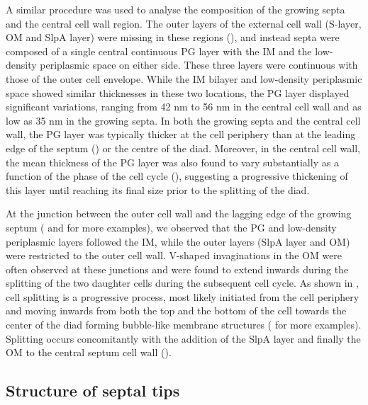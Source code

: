 A similar procedure was used to analyse the composition of the growing septa and the central cell wall region.
The outer layers of the external cell wall (S-layer, OM and SlpA layer) were missing in these regions (), and instead septa were composed of a single central continuous PG layer with the IM and the low-density periplasmic space on either side.
These three layers were continuous with those of the outer cell envelope.
While the IM bilayer and low-density periplasmic space showed similar thicknesses in these two locations, the PG layer displayed significant variations, ranging from 42 nm to 56 nm in the central cell wall and as low as 35 nm in the growing septa.
In both the growing septa and the central cell wall, the PG layer was typically thicker at the cell periphery than at the leading edge of the septum () or the centre of the diad.
Moreover, in the central cell wall, the mean thickness of the PG layer was also found to vary substantially as a function of the phase of the cell cycle (), suggesting a progressive thickening of this layer until reaching its final size prior to the splitting of the diad.

At the junction between the outer cell wall and the lagging edge of the growing septum ( and  for more examples), we observed that the PG and low-density periplasmic layers followed the IM, while the outer layers (SlpA layer and OM) were restricted to the outer cell wall.
V-shaped invaginations in the OM were often observed at these junctions and were found to extend inwards during the splitting of the two daughter cells during the subsequent cell cycle.
As shown in , cell splitting is a progressive process, most likely initiated from the cell periphery and moving inwards from both the top and the bottom of the cell towards the center of the diad forming bubble-like membrane structures ( for more examples).
Splitting occurs concomitantly with the addition of the SlpA layer and finally the OM to the central septum cell wall ().


\subsection{Structure of septal tips}

